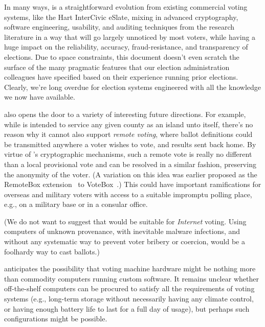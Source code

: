 \label{sec:future}
\label{sec:conclusion}

In many ways, \projname is a straightforward evolution from existing
commercial voting systems, like the Hart InterCivic eSlate, mixing in
advanced cryptography, software engineering, usability, and auditing
techniques from the research literature in a way that will go largely
unnoticed by most voters, while having a huge impact on the
reliability, accuracy, fraud-resistance, and transparency of
elections. Due to space constraints, this document doesn't even
scratch the surface of the many pragmatic features that our election
administration colleagues have specified based on their experience
running prior elections. Clearly, we're long overdue for election
systems engineered with all the knowledge we now have available.

\projname also opens the door to a variety of interesting future
directions. For example, while \projname is intended to service any
given county as an island unto itself, there's no reason why it cannot
also support {\em remote voting}, where ballot definitions could be
transmitted anywhere a voter wishes to vote, and results sent back
home. By virtue of \projname's cryptographic mechanisms, such a remote
vote is really no different than a local provisional vote and can be
resolved in a similar fashion, preserving the anonymity of the
voter. (A variation on this idea was earlier proposed as the RemoteBox
extension~\cite{remotebox08} to VoteBox~\cite{sandler08votebox}.)
This could have important ramifications for overseas and military
voters with access to a suitable impromptu polling place, e.g., on a
military base or in a consular office.

(We do not want to suggest that \projname
would be suitable for {\em Internet} voting. Using computers of
unknown provenance, with inevitable malware infections, and
without any systematic way to prevent voter bribery or coercion,
would be a foolhardy way to cast ballots.)

\projname anticipates the possibility that voting machine
hardware might be nothing more than commodity computers running custom
software. It remains unclear whether off-the-shelf computers can be
procured to satisfy all the requirements of voting systems (e.g.,
long-term storage without necessarily having any climate control, or
having enough battery life to last for a full day of usage), but
perhaps such configurations might be possible.


